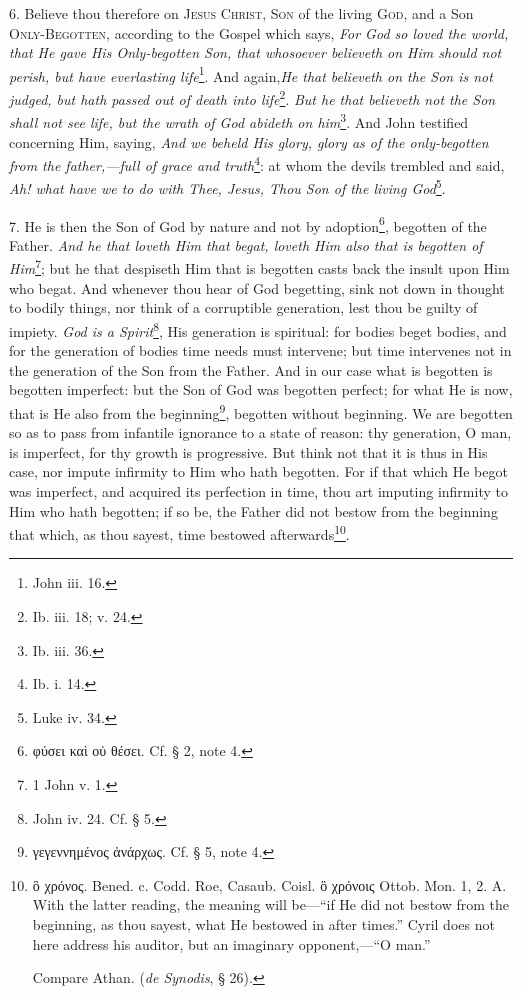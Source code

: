 6. Believe thou therefore on \textsc{Jesus Christ}, \textsc{Son} of the living \textsc{God}, and a Son \textsc{Only-Begotten}, according to the Gospel which says, \emph{For God so loved the world, that He gave His Only-begotten Son, that whosoever believeth on Him should not perish, but have everlasting life}\footnote{John iii. 16.}. And again,\emph{He that believeth on the Son is not judged, but hath passed out of death into life}\footnote{Ib. iii. 18; v. 24.}. \emph{But he that believeth not the Son shall not see life, but the wrath of God abideth on him}\footnote{Ib. iii. 36.}. And John testified concerning Him, saying, \emph{And we beheld His glory, glory as of the only-begotten from the father,—full of grace and truth}\footnote{Ib. i. 14.}: at whom the devils trembled and said, \emph{Ah! what have we to do with Thee, Jesus, Thou Son of the living God}\footnote{Luke iv. 34.}.

7. He is then the Son of God by nature and not by adoption\footnote{\textgreek{φύσει καὶ οὐ θέσει}. Cf. § 2, note 4.}, begotten of the Father. \emph{And he that loveth Him that begat, loveth Him also that is begotten of Him}\footnote{1 John v. 1.}; but he that despiseth Him that is begotten casts back the insult upon Him who begat. And whenever thou hear of God begetting, sink not down in thought to bodily things, nor think of a corruptible generation, lest thou be guilty of impiety. \emph{God is a Spirit}\footnote{John iv. 24. Cf. § 5.}, His generation is spiritual: for bodies beget bodies, and for the generation of bodies time needs must intervene; but time intervenes not in the generation of the Son from the Father. And in our case what is begotten is begotten imperfect: but the Son of God was begotten perfect; for what He is now, that is He also from the beginning\footnote{\textgreek{γεγεννημένος ἀνάρχως}. Cf. § 5, note 4.}, begotten without beginning. We are begotten so as to pass from infantile ignorance to a state of reason: thy generation, O man, is imperfect, for thy growth is progressive. But think not that it is thus in His case, nor impute infirmity to Him who hath begotten. For if that which He begot was imperfect, and acquired its perfection in time, thou art imputing infirmity to Him who hath begotten; if so be, the Father did not bestow from the beginning that which, as thou sayest, time bestowed afterwards\footnote{\textgreek{ὃ χρόνος}. Bened. c. Codd. Roe, Casaub. Coisl. \textgreek{ὃ χρόνοις} Ottob. Mon. 1, 2. A. With the latter reading, the meaning will be—“if He did not bestow from the beginning, as thou sayest, what He bestowed in after times.” Cyril does not here address his auditor, but an imaginary opponent,—“O man.” \par Compare Athan. (\emph{de Synodis}, § 26).}.

